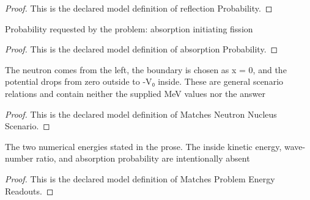\begin{proof}
  This is the declared model definition of reflection Probability.
\end{proof}
\begin{definition}
  \label{def:physics:phyx-mini-0600:phyxminiproblems-problemphyxmini0600-absorptionprobability}
  Probability requested by the problem: absorption initiating fission
\end{definition}
\begin{proof}
  This is the declared model definition of absorption Probability.
\end{proof}
\begin{definition}
  \label{def:physics:phyx-mini-0600:phyxminiproblems-problemphyxmini0600-matchesneutronnucleusscenario}
  The neutron comes from the left, the boundary is chosen as x = 0, and the potential drops from zero outside to -V₀ inside. These are general scenario relations and contain neither the supplied MeV values nor the answer
\end{definition}
\begin{proof}
  This is the declared model definition of Matches Neutron Nucleus Scenario.
\end{proof}
\begin{definition}
  \label{def:physics:phyx-mini-0600:phyxminiproblems-problemphyxmini0600-matchesproblemenergyreadouts}
  The two numerical energies stated in the prose. The inside kinetic energy, wave-number ratio, and absorption probability are intentionally absent
\end{definition}
\begin{proof}
  This is the declared model definition of Matches Problem Energy Readouts.
\end{proof}
